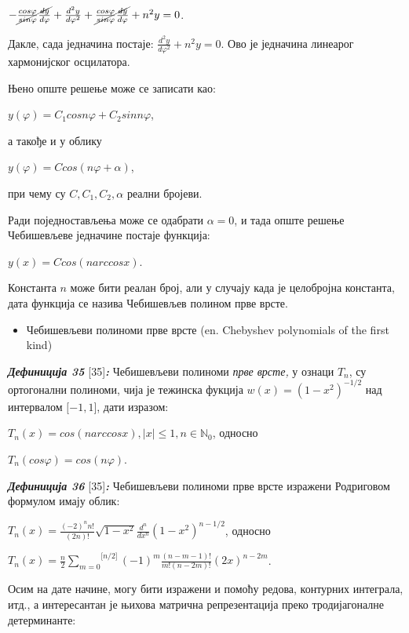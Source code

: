 \(- \cancel{\frac{cos\varphi}{sin\varphi}\frac{dy}{d\varphi}} + \frac{d^{2}y}{d\varphi^{2}} + \cancel{\frac{cos\varphi}{sin\varphi}\frac{dy}{d\varphi}} + n^{2}y = 0\).

Дакле, сада једначина постаје:
\(\frac{d^{2}y}{d\varphi^{2}} + n^{2}y = 0\). Ово је једначина линеарог
хармонијског осцилатора.

Њено опште решење може се записати као:

\(y(\varphi) = C_{1}cosn\varphi + C_{2}sinn\varphi\),

а такође и у облику

\(y(\varphi) = Ccos(n\varphi + \alpha)\),

при чему су \(C,C_{1},C_{2},\alpha\) реални бројеви.

Ради поједностављења може се одабрати \(\alpha = 0\), и тада опште
решење Чебишевљеве једначине постаје функција:

\(y(x) = Ccos(narccosx)\).

Константа \(n\) може бити реалан број, али у случају када је целобројна
константа, дата функција се назива Чебишевљев полином прве врсте.

\begin{itemize}
\item
  Чебишевљеви полиноми прве врсте (en. Chebyshev polynomials of the
  first kind)
\end{itemize}

\emph{\textbf{Дефиниција 35}} {[}35{]}\emph{\textbf{:}} Чебишевљеви
полиноми \emph{прве врсте,} у ознаци \(T_{n}\), су ортогонални полиноми,
чија је тежинска фукција \(w(x) = {(1 - x^{2})}^{- 1/2}\) над интервалом
\(\lbrack - 1,1\rbrack\), дати изразом:

\(T_{n}(x) = cos(narccosx),|x| \leq 1,n \in \mathbb{N}_{0}\), односно

\(T_{n}(cos\varphi) = cos(n\varphi)\).

\emph{\textbf{Дефиниција 36}} {[}35{]}\emph{\textbf{:}} Чебишевљеви
полиноми прве врсте изражени Родриговом формулом имају облик:

\(T_{n}(x) = \frac{{( - 2)}^{n}n!}{(2n)!}\sqrt{1 - x^{2}}\frac{d^{n}}{dx^{n}}{(1 - x^{2})}^{n - 1/2}\),
односно

\(T_{n}(x) = \frac{n}{2}\overset{\lbrack n/2\rbrack}{\sum_{m = 0}}{( - 1)}^{m}\frac{(n - m - 1)!}{m!(n - 2m)!}{(2x)}^{n - 2m}\).

Осим на дате начине, могу бити изражени и помоћу редова, контурних
интеграла, итд., а интересантан је њихова матрична репрезентација преко
тродијагоналне детерминанте:

